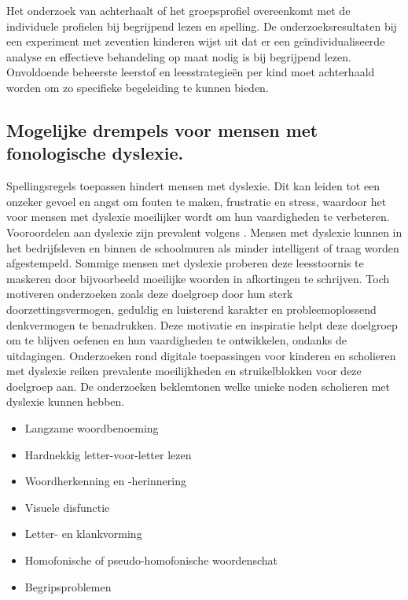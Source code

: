 Het onderzoek van \textcite{VanVreckem2015} achterhaalt of het groepsprofiel overeenkomt met de individuele profielen bij begrijpend lezen en spelling. De onderzoeksresultaten bij een experiment met zeventien kinderen wijst uit dat er een geïndividualiseerde analyse en effectieve behandeling op maat nodig is bij begrijpend lezen. Onvoldoende beheerste leerstof en leesstrategieën per kind moet achterhaald worden om zo specifieke begeleiding te kunnen bieden.

\subsection{Mogelijke drempels voor mensen met fonologische dyslexie.}


Spellingsregels toepassen hindert mensen met dyslexie. Dit kan leiden tot een onzeker gevoel en angst om fouten te maken, frustratie en stress, waardoor het voor mensen met dyslexie moeilijker wordt om hun vaardigheden te verbeteren. Vooroordelen aan dyslexie zijn prevalent volgens \textcite{Diels2022}. Mensen met dyslexie kunnen in het bedrijfsleven en binnen de schoolmuren als minder intelligent of traag worden afgestempeld. Sommige mensen met dyslexie proberen deze leesstoornis te maskeren door bijvoorbeeld moeilijke woorden in afkortingen te schrijven. Toch motiveren onderzoeken zoals \textcite{Ghesquiere2018, Lissens2020, Bonte2020} deze doelgroep door hun sterk doorzettingsvermogen, geduldig en luisterend karakter en probleemoplossend denkvermogen te benadrukken. Deze motivatie en inspiratie helpt deze doelgroep om te blijven oefenen en hun vaardigheden te ontwikkelen, ondanks de uitdagingen. Onderzoeken rond digitale toepassingen voor kinderen en scholieren met dyslexie reiken prevalente moeilijkheden en struikelblokken voor deze doelgroep aan. De onderzoeken beklemtonen welke unieke noden scholieren met dyslexie kunnen hebben.

\begin{itemize}
	\item Langzame woordbenoeming
	\item Hardnekkig letter-voor-letter lezen
	\item Woordherkenning en -herinnering
	\item Visuele disfunctie
	\item Letter- en klankvorming
	\item Homofonische of pseudo-homofonische woordenschat
	\item Begripsproblemen
\end{itemize}

